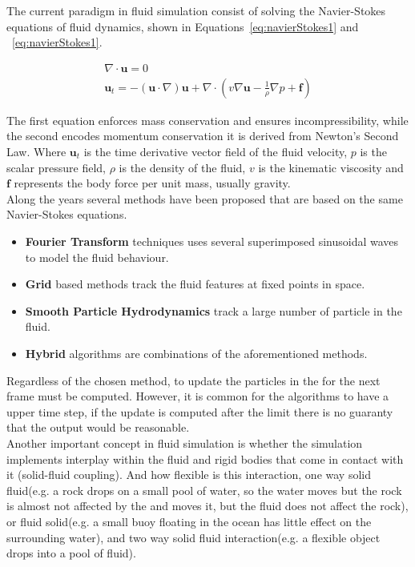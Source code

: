 The current paradigm in fluid simulation consist of solving the Navier-Stokes equations of fluid dynamics, shown in Equations~\ref{eq:navierStokes1} and  ~\ref{eq:navierStokes1}.

\begin{gather}
\label{eq:navierStokes1}
\nabla \cdot \mathbf{u} = 0\\
\label{eq:navierStokes2}
\mathbf{u}_t = -(\mathbf{u} \cdot \nabla)\mathbf{u} + \nabla \cdot ( v \nabla \mathbf{u} - \frac{1}{\rho} \nabla p + \mathbf{f} )
\end{gather}

The first equation enforces mass conservation and ensures incompressibility, while the second encodes momentum conservation it is derived from Newton's Second Law.
Where $\mathbf{u}_t$ is the time derivative vector field of the fluid velocity, $p$  is the scalar pressure field, $\rho$ is the density of the fluid, $v$ is the kinematic viscosity and $\mathbf{f}$ represents the body force per unit mass, usually gravity.\\

Along the years several methods have been proposed that are based on the same Navier-Stokes equations.

\begin{itemize}
\item \textbf{Fourier Transform} techniques uses several superimposed sinusoidal waves to model the fluid behaviour.
\item \textbf{Grid} based methods track the fluid features at fixed points in space.
\item \textbf{Smooth Particle Hydrodynamics} track a large number of particle in the fluid.
\item \textbf{Hybrid} algorithms are combinations of the aforementioned methods.\\
\end{itemize}

Regardless of the chosen method, to update the particles in the for the next frame must be computed.
However, it is common for the algorithms to have a upper time step, if the update is computed after the limit there is no guaranty that the output would be reasonable.\\

Another important concept in fluid simulation is whether the simulation implements interplay within the fluid and rigid bodies that come in contact with it (solid-fluid coupling).
And how flexible is this interaction, one way solid fluid(e.g. a rock drops on a small pool of water, so the water moves but the rock is almost not affected by the  and moves it, but the fluid does not affect the rock), or fluid solid(e.g. a small buoy floating in the ocean has little effect on the surrounding water), and two way solid fluid interaction(e.g. a flexible object drops into a pool of fluid).\\

